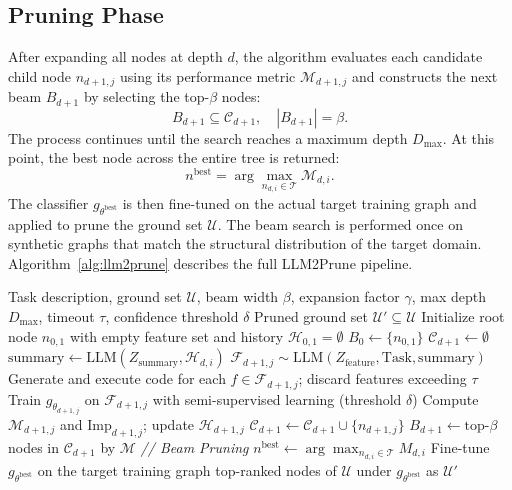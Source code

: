 \subsection{Pruning Phase}

After expanding all nodes at depth $d$, the algorithm evaluates each candidate child node
$n_{d+1,j}$ using its performance metric $\mathcal{M}_{d+1,j}$ and constructs the next beam
$B_{d+1}$ by selecting the top-$\beta$ nodes:
\[
B_{d+1} \subseteq \mathcal{C}_{d+1}, \quad |B_{d+1}| = \beta.
\]
The process continues until the search reaches a maximum depth $D_{\max}$. At this point,
the best node across the entire tree is returned:
\[
n^{\text{best}} = \arg\max_{n_{d,i} \in \mathcal{T}} \mathcal{M}_{d,i}.
\]
The classifier $g_{\theta^{\text{best}}}$ is then fine-tuned on the actual target training
graph and applied to prune the ground set $\mathcal{U}$. The beam search is performed once
on synthetic graphs that match the structural distribution of the target domain.
Algorithm~\ref{alg:llm2prune} describes the full LLM2Prune pipeline.

\begin{algorithm}[t]
\caption{LLM2Prune}
\label{alg:llm2prune}
\begin{algorithmic}[1]
\REQUIRE Task description, ground set $\mathcal{U}$, beam width $\beta$, expansion factor $\gamma$, max depth $D_{\max}$, timeout $\tau$, confidence threshold $\delta$
\ENSURE Pruned ground set $\mathcal{U}' \subseteq \mathcal{U}$
\STATE Initialize root node $n_{0,1}$ with empty feature set and history $\mathcal{H}_{0,1} = \emptyset$
\STATE $B_0 \leftarrow \{n_{0,1}\}$
    \STATE $\mathcal{C}_{d+1} \leftarrow \emptyset$
        \STATE $\text{summary} \leftarrow \text{LLM}(Z_{\text{summary}}, \mathcal{H}_{d,i})$
            \STATE $\mathcal{F}_{d+1,j} \sim \text{LLM}(Z_{\text{feature}}, \text{Task}, \text{summary})$
            \STATE Generate and execute code for each $f \in \mathcal{F}_{d+1,j}$; discard features exceeding $\tau$
            \STATE Train $g_{\theta_{d+1,j}}$ on $\mathcal{F}_{d+1,j}$ with semi-supervised learning (threshold $\delta$)
            \STATE Compute $\mathcal{M}_{d+1,j}$ and $\text{Imp}_{d+1,j}$; update $\mathcal{H}_{d+1,j}$
            \STATE $\mathcal{C}_{d+1} \leftarrow \mathcal{C}_{d+1} \cup \{n_{d+1,j}\}$
        \ENDFOR
    \ENDFOR
    \STATE $B_{d+1} \leftarrow \text{top-}\beta$ nodes in $\mathcal{C}_{d+1}$ by $\mathcal{M}$ \hfill \textit{// Beam Pruning}
\ENDFOR
\STATE $n^{\text{best}} \leftarrow \arg\max_{n_{d,i} \in \mathcal{T}} M_{d,i}$
\STATE Fine-tune $g_{\theta^{\text{best}}}$ on the target training graph
\RETURN top-ranked nodes of $\mathcal{U}$ under $g_{\theta^{\text{best}}}$ as $\mathcal{U}'$
\end{algorithmic}
\end{algorithm}

